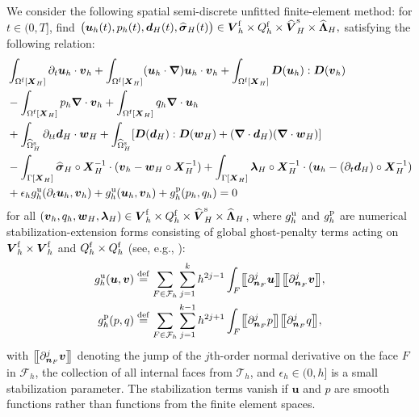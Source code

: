 \documentclass[11pt,reqno]{amsart}
\theoremstyle{definition}
\theoremstyle{plain}
\numberwithin{theorem}{section}
\numberwithin{proposition}{section}
\numberwithin{lemma}{section}
\numberwithin{equation}{section}
\newcommand{\bs}[1]{\boldsymbol{#1}}
\newcommand{\uu}[1]  {{\bs{#1}} }
\newcommand{\grad}   { \uu{\nabla}    }
\newcommand{\bv}{{\bs v}}
\newcommand{\bu}{\uu{u}}
\newcommand{\bw}{{\bs w}}
\newcommand{\bn}{{\bs n}}
\renewcommand{\(}{\bigl(}
\renewcommand{\)}{\bigr)}
\newcommand{\jump}[1]{\bigl[\hspace{-0.03in}\bigl[#1\bigr]\hspace{-0.03in}\bigr]}
\def\eqd{\stackrel{\mathrm{def}}{=}}
\begin{document}
We consider the following  spatial semi-discrete unfitted finite-element method: for $t\in(0,T]$,  find $\big(\bu_h(t),p_h(t), {\bs d}_H(t), \widehat{\bs\sigma} _H(t)\big)\in {\bs V}_h^{\rm f} \times  Q_h^{\rm f} \times \widehat{\bs V}_H^{\rm s} \times \widehat{\bs \Lambda}_H,$ 
satisfying the following relation: 
\begin{equation}
\label{eq:discrete-semi-fsi}
\begin{aligned}
&\int_{\Omega^{\rm f}[\bs X_H]} \partial_t \bs u_h \cdot {\bs v}_h  + \int_{\Omega^{\rm f}[\bs X_H]}   (\bs u_h \cdot \grad) \bu_h \cdot {\bs v}_h 
+   \int_{\Omega^{\rm f}[\bs X_H]} \bs D(\bu_h): \bs D(\bv_h)  \\
& - \int_{\Omega^{\rm f}[\bs X_H]}  p_h \grad\cdot \bv_h + \int_{\Omega^{\rm f}[\bs X_H]}  q_h \grad\cdot \bu_h \\
& +  \int_{\widehat{\Omega}^{\rm s}_H} \partial_{tt}{\bs d}_H \cdot \bw_H + \int_{\widehat{\Omega}^{\rm s}_H} [{\bs D}({\bs d}_H) : {\bs D}({\bs w}_H) + (\grad\cdot{\bs d}_H)(\grad\cdot{\bs w}_H) ] \\
& - \int_{\Gamma[\bs X_H]} \widehat{\bs \sigma} _H \circ {\bs X}_H^{-1} \cdot ( \bv_h - \bw_H \circ {\bs X}_H^{-1}) 
+ \int_{\Gamma[\bs X_H]} \bs \lambda_H \circ {\bs X}_H^{-1} \cdot ( \bu_h - (\partial_t{\bs d}_H) \circ {\bs X}_H^{-1})  \\
& + \epsilon_h g_h^{\rm u} (\partial_t\bu_h,\bv_h ) + g_h^{\rm u} (\bu_h,\bv_h ) + g_h^{\rm p} (p_h,q_h ) 
= 0 
\end{aligned}
\end{equation}
for  all $(\bv_h,q_h, \bw_H, \bs \lambda_H)\in {\bs V}_h^{\rm f} \times  Q_h^{\rm f} \times \widehat{\bs V}_H^{\rm s} \times \widehat{\bs \Lambda}_H$, where $g_h^{\rm u}$ and $g_h^{\rm p}$ are numerical stabilization-extension  forms consisting of global ghost-penalty terms acting on ${\bs V}_h^{\rm f}\times {\bs V}_h^{\rm f}$ and $Q_h^{\rm f}\times Q_h^{\rm f}$ (see, e.g., \cite{burman-10, Burman_Hansbo_Larson_Zahedi_2025,maxim-and-whal-25}):
\begin{equation}
\begin{split}
g_h^{\rm u}(\bu,\bv) 
&\eqd \sum_{F\in {\mathcal F}_h} \sum_{j=1}^{k} h^{2j-1}\int_F \jump{\partial^j_{\bn_F} \bu} \jump{\partial^j_{\bn_F} \bv} ,\\
g_h^{\rm p}(p,q) 
&\eqd \sum_{F\in {\mathcal F}_h} \sum_{j=1}^{k-1} h^{2j+1} \int_F  \jump{\partial^j_{\bn_F} p}\jump{\partial^j_{\bn_F}q} ,
\end{split}
\label{eqn:GPForms}
\end{equation}
with $\jump{\partial^j_{\bn_F} \bv}$ denoting the jump of the $j$th-order normal derivative on the face $F$ in ${\mathcal F}_h $, the collection of all internal faces from ${\mathcal T}_h$, and $\epsilon_h\in(0,h]$ is a small stabilization parameter. The stabilization terms vanish if ${\bs u}$ and $p$ are smooth functions rather than functions from the finite element spaces. 
\end{document}
